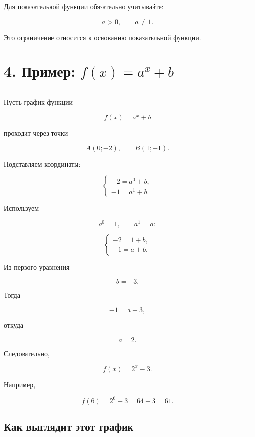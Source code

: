 \documentclass[a4paper,12pt]{article}
\newcommand{\sectionline}{%
    \vspace{0.2em}
    {\color{accent}\rule{\linewidth}{0.7pt}}
    \vspace{0.45em}
}
\begin{document}
Для показательной функции обязательно учитывайте:

\[
\boxed{a>0,\qquad a\ne1.}
\]

Это ограничение относится к основанию показательной функции.




\section*{\textcolor{darkaccent}{4. Пример: \(f(x)=a^x+b\)}}

\sectionline

Пусть график функции

\[
f(x)=a^x+b
\]

проходит через точки

\[
A(0;-2),
\qquad
B(1;-1).
\]

Подставляем координаты:

\[
\begin{cases}
-2=a^0+b,\\
-1=a^1+b.
\end{cases}
\]

Используем

\[
a^0=1,
\qquad
a^1=a:
\]

\[
\begin{cases}
-2=1+b,\\
-1=a+b.
\end{cases}
\]

Из первого уравнения

\[
b=-3.
\]

Тогда

\[
-1=a-3,
\]

откуда

\[
a=2.
\]

Следовательно,

\[
\boxed{f(x)=2^x-3}.
\]

Например,

\[
f(6)=2^6-3=64-3=61.
\]

\subsection*{\textcolor{accent}{Как выглядит этот график}}
\end{document}
